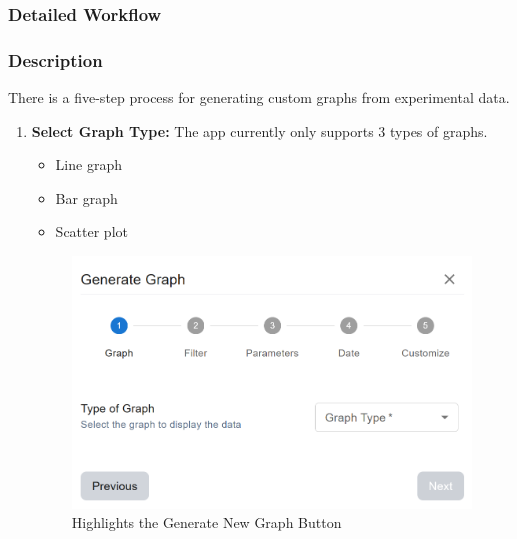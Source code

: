 \documentclass[12pt]{article}
\begin{document}
\subsubsection{Detailed Workflow}
\subsubsection*{Description}
There is a five-step process for generating custom graphs from experimental data.

\begin{enumerate}
    \item \textbf{Select Graph Type:} \newline
    The app currently only supports 3 types of graphs. 
    \begin{itemize}
        \item Line graph 
        \item Bar graph 
        \item Scatter plot
    \end{itemize}
    \begin{figure}[H]
        \centering
        \includegraphics[scale=0.4]{./Diagrams/graph-form .png}
        \caption{Highlights the Generate New Graph Button}
        \label{fig:graphtype}
    \end{figure}


\end{enumerate}
\end{document}
